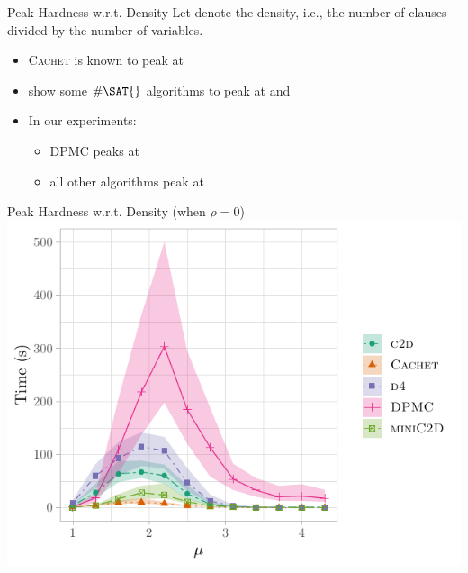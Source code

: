 \documentclass{beamer}
\begin{document}

\begin{frame}{Peak Hardness w.r.t. Density}
  Let \structure{$\mu$} denote the \alert{density}, i.e., the number of clauses
  divided by the number of variables.
  \begin{itemize}
    \item \textsc{Cachet} is known to peak at 
          \textcolor{gray}{\parencite{DBLP:conf/sat/SangBBKP04}}
    \item \textcolor{gray}{\textcite{DBLP:conf/aaai/Pehoushek00}} show some
          $\#\SAT{}$ algorithms to peak at  and
          \pause
    \item In our experiments:
    \begin{itemize}
      \item \textsc{DPMC} peaks at 
      \item all other algorithms peak at 
    \end{itemize}
  \end{itemize}
\end{frame}

\begin{frame}{Peak Hardness w.r.t. Density (when $\rho = 0$)}
  \centering
  \includegraphics{treewidth.pdf}
\end{frame}
\end{document}
